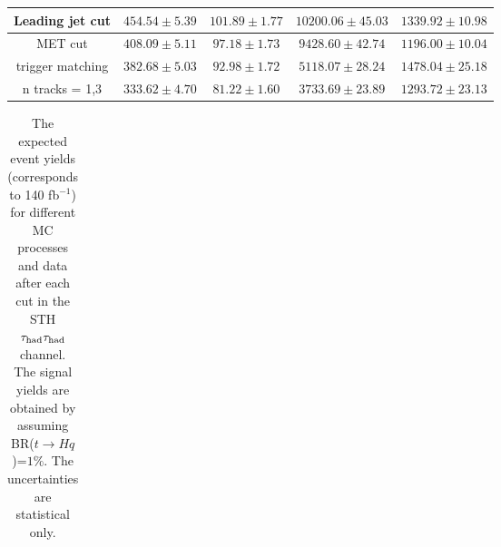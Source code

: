 \begin{table}
\begin{tabular}{|c|c|c|c|c|}
Leading jet cut & $454.54 \pm 5.39$ & $101.89 \pm 1.77$ & $10200.06 \pm 45.03$ & $1339.92 \pm 10.98$ \\ \hline
MET cut & $408.09 \pm 5.11$ & $97.18 \pm 1.73$ & $9428.60 \pm 42.74$ & $1196.00 \pm 10.04$ \\ \hline
trigger matching & $382.68 \pm 5.03$ & $92.98 \pm 1.72$ & $5118.07 \pm 28.24$ & $1478.04 \pm 25.18$ \\ \hline
n tracks = 1,3 & $333.62 \pm 4.70$ & $81.22 \pm 1.60$ & $3733.69 \pm 23.89$ & $1293.72 \pm 23.13$ \\ \hline
\end{tabular}
\label{tab:yields_hh_3}
\end{table}


\begin{table}
\footnotesize
\caption{ The expected event yields (corresponds to 140 fb$^{-1}$) for different MC processes and data after each cut in the STH $\tau_\text{had}{}\tau_\text{had}$ channel. The signal yields are obtained by assuming BR($t\to Hq$)=$1\%$. The uncertainties are statistical only.}
\centering
\begin{tabular}{|c|c|c|c|c|c|} \hline


\end{tabular}
\end{table}
